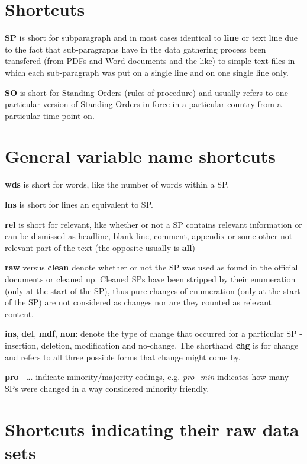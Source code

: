 \documentclass[]{article}
\begin{document}
\section{Shortcuts}\label{shortcuts}

\textbf{SP} is short for subparagraph and in most cases identical to
\textbf{line} or text line due to the fact that sub-paragraphs have in
the data gathering process been transfered (from PDFs and Word documents
and the like) to simple text files in which each sub-paragraph was put
on a single line and on one single line only.

\textbf{SO} is short for Standing Orders (rules of procedure) and
usually refers to one particular version of Standing Orders in force in
a particular country from a particular time point on.

\section{General variable name
shortcuts}\label{general-variable-name-shortcuts}

\textbf{wds} is short for words, like the number of words within a SP.

\textbf{lns} is short for lines an equivalent to SP.

\textbf{rel} is short for relevant, like whether or not a SP contains
relevant information or can be dismissed as headline, blank-line,
comment, appendix or some other not relevant part of the text (the
opposite usually is \textbf{all})

\textbf{raw} versus \textbf{clean} denote whether or not the SP was used
as found in the official documents or cleaned up. Cleaned SPs have been
stripped by their enumeration (only at the start of the SP), thus pure
changes of enumeration (only at the start of the SP) are not considered
as changes nor are they counted as relevant content.

\textbf{ins}, \textbf{del}, \textbf{mdf}, \textbf{non}: denote the type
of change that occurred for a particular SP - insertion, deletion,
modification and no-change. The shorthand \textbf{chg} is for change and
refers to all three possible forms that change might come by.

\textbf{pro\_\ldots{}} indicate minority/majority codings, e.g.
\emph{pro\_min} indicates how many SPs were changed in a way considered
minority friendly.

\section{Shortcuts indicating their raw data
sets}\label{shortcuts-indicating-their-raw-data-sets}
\end{document}
